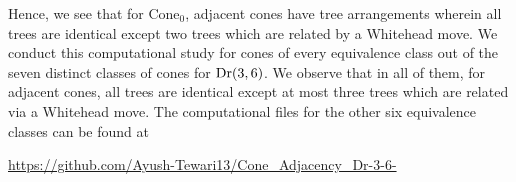 \documentclass[12pt]{article}
\DeclareMathOperator{\Dr}{\rm Dr}
\theoremstyle{plain}
\theoremstyle{definition}
\numberwithin{subcase}{case}
\begin{document}


Hence, we see that for Cone$_{0}$, adjacent cones have tree arrangements wherein all trees are identical except two trees which are related by a Whitehead move. We conduct this computational study for cones of every equivalence class out of the seven distinct classes of cones for $\Dr(3,6)$. We observe that in all of them, for adjacent cones, all trees are identical except at most three trees which are related via a Whitehead move. The computational files for the other six equivalence classes can be found at 

\begin{center}
    
\url{https://github.com/Ayush-Tewari13/Cone_Adjacency_Dr-3-6-}

\end{center}
\end{document}

